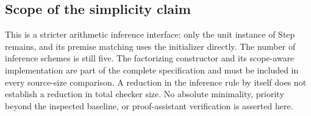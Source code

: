 \subsection{Scope of the simplicity claim}

This is a stricter arithmetic inference interface: only the unit
instance of Step remains, and its premise matching uses the
initializer directly.  The number of inference schemes is still five.
The factorizing constructor and its scope-aware implementation are
part of the complete specification and must be included in every
source-size comparison.  A reduction in the inference rule by itself
does not establish a reduction in total checker size.  No absolute
minimality, priority beyond the inspected baseline, or proof-assistant
verification is asserted here.
